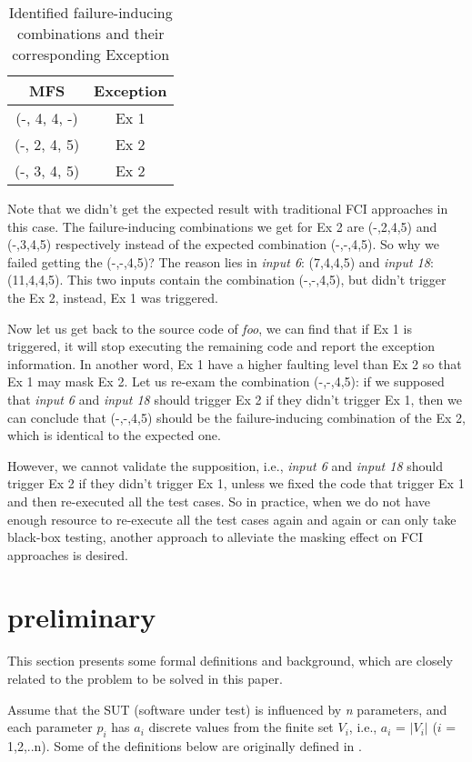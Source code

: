 \documentclass{sig-alternate}
\begin{document}
\begin{table}
\centering
\caption{Identified failure-inducing combinations and their corresponding Exception}
\label{identify-example}
\begin{tabular}{|c|c|} \hline
MFS & Exception\\ \hline
(-, 4, 4, -) &  Ex 1\\ \hline
(-, 2, 4, 5) &  Ex 2\\ \hline
(-, 3, 4, 5) &  Ex 2\\ \hline
\hline\end{tabular}
\end{table}

Note that we didn't get the expected result with traditional FCI approaches in this case. The failure-inducing combinations we get for Ex 2 are (-,2,4,5) and (-,3,4,5) respectively instead of the expected combination (-,-,4,5). So why we failed getting the (-,-,4,5)? The reason lies in \emph{input 6}: (7,4,4,5) and \emph{input 18}: (11,4,4,5). This two inputs contain the combination (-,-,4,5), but didn't trigger the Ex 2, instead,  Ex 1 was triggered.

Now let us get back to the source code of \emph{foo}, we can find that if Ex 1 is triggered, it will stop executing the remaining code and report the exception information. In another word, Ex 1 have a higher faulting level than Ex 2 so that Ex 1 may mask Ex 2. Let us re-exam the combination (-,-,4,5): if we supposed that \emph{input 6} and \emph{input 18} should trigger Ex 2 if they didn't trigger Ex 1, then we can conclude that (-,-,4,5) should be the failure-inducing combination of the Ex 2, which is identical to the expected one.

However, we cannot validate the supposition, i.e., \emph{input 6} and \emph{input 18} should trigger Ex 2 if they didn't trigger Ex 1, unless we fixed the code that trigger Ex 1 and then re-executed all the test cases. So in practice, when we do not have enough resource to re-execute all the test cases again and again or can only take black-box testing, another approach to alleviate the masking effect on FCI approaches is desired.

\section{preliminary}
This section presents some formal definitions and background, which are closely related to the problem to be solved in this paper.

Assume that the SUT (software under test) is influenced by \emph{n} parameters, and each parameter $p_{i}$ has $a_{i}$ discrete values from the finite set $V_{i}$, i.e., $a_{i}$ = $|V_{i}|$ ($i$ = 1,2,..n). Some of the definitions below are originally defined in \cite{nie2011survey}.
\end{document}
